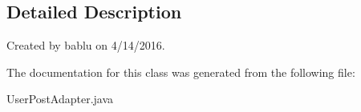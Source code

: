 \subsection{\-Detailed \-Description}
\-Created by bablu on 4/14/2016. 

\-The documentation for this class was generated from the following file\-:\begin{DoxyCompactItemize}
\item 
\-User\-Post\-Adapter.\-java\end{DoxyCompactItemize}
